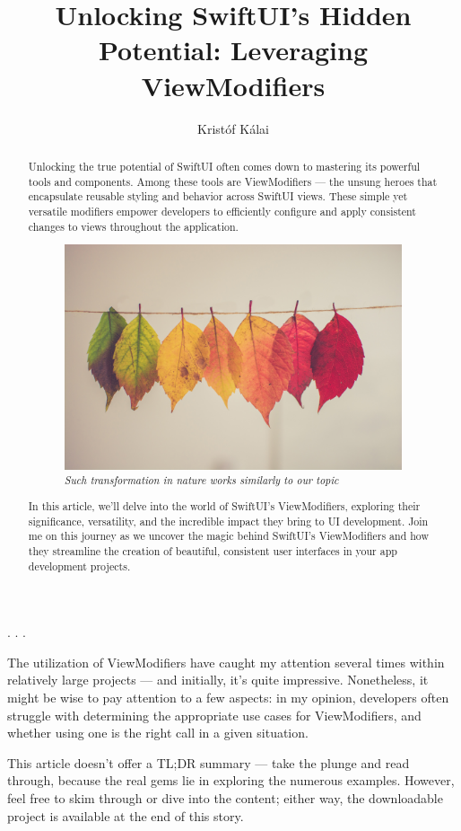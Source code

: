 \documentclass{article}
\title{Unlocking SwiftUI’s Hidden Potential: Leveraging ViewModifiers}
\author{Kristóf Kálai}
\newcommand{\separator}{\vspace{5mm}\centerline{. . .}\vspace{5mm}}
\begin{document}
\maketitle

\renewcommand{\abstractname}{\vspace{-\baselineskip}}
\begin{abstract}
Unlocking the true potential of SwiftUI often comes down to mastering its powerful tools and components. Among these tools are ViewModifiers — the unsung heroes that encapsulate reusable styling and behavior across SwiftUI views. These simple yet versatile modifiers empower developers to efficiently configure and apply consistent changes to views throughout the application.

\begin{figure}[h]
\centering
\includegraphics[width=0.5\linewidth]{leaves.jpg}
\caption{\emph{Such transformation in nature works similarly to our topic}}
\end{figure}

In this article, we’ll delve into the world of SwiftUI’s ViewModifiers, exploring their significance, versatility, and the incredible impact they bring to UI development. Join me on this journey as we uncover the magic behind SwiftUI’s ViewModifiers and how they streamline the creation of beautiful, consistent user interfaces in your app development projects.
\end{abstract}

\separator

The utilization of ViewModifiers have caught my attention several times within relatively large projects — and initially, it’s quite impressive. Nonetheless, it might be wise to pay attention to a few aspects: in my opinion, developers often struggle with determining the appropriate use cases for ViewModifiers, and whether using one is the right call in a given situation.

This article doesn’t offer a TL;DR summary — take the plunge and read through, because the real gems lie in exploring the numerous examples. However, feel free to skim through or dive into the content; either way, the downloadable project is available at the end of this story.
\end{document}

